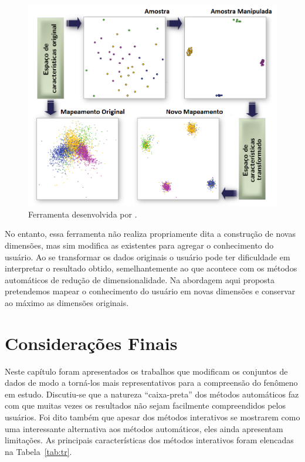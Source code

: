\begin{figure}[h!]
    \centering
    \includegraphics[width=16cm]{images/ud.png}
    \caption{Ferramenta desenvolvida por \cite{Gladys2013}.}
    \label{fig:ud}
\end{figure}

No entanto, essa ferramenta não realiza propriamente dita a
construção de novas dimensões, mas sim modifica as
existentes para agregar o conhecimento do usuário. Ao se
transformar os dados originais o usuário pode ter
dificuldade em interpretar o resultado obtido,
semelhantemente ao que acontece com os métodos automáticos
de redução de dimensionalidade.  Na abordagem aqui proposta
pretendemos mapear o conhecimento do usuário em novas
dimensões e conservar ao máximo as dimensões originais.

\section{Considerações Finais}

Neste capítulo foram apresentados os trabalhos que modificam
os conjuntos de dados de modo a torná-los mais
representativos para a compreensão do fenômeno em estudo.
Discutiu-se que a natureza ``caixa-preta'' dos métodos
automáticos faz com que muitas vezes os resultados não sejam
facilmente compreendidos pelos usuários. Foi dito também que
apesar dos métodos interativos se mostrarem como uma
interessante alternativa aos métodos automáticos, eles ainda
apresentam limitações. As principais características dos
métodos interativos foram elencadas na Tabela~\ref{tab:tr}.

